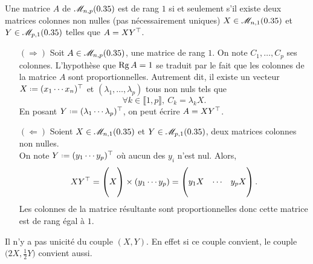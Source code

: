 \begin{prop}{} 
    Une matrice $A$ de $\mathscr{M}_{n,p}(0.35)$ est de rang $1$ si et seulement s'il existe deux matrices colonnes non nulles (pas nécessairement uniques) $X \in \mathscr{M}_{n,1}(0.35)$ et $Y \in \mathscr{M}_{p,1}(0.35)$ telles que $A = X Y^\top$. 
\end{prop}

\begin{preuve}
    \begin{itemize}
        \item[$(\Rightarrow)$] Soit $A \in \mathscr{M}_{n,p}(0.35)$, une matrice de rang $1$. On note $C_1, \dots, C_p$ ses colonnes. L'hypothèse que $\mathrm{Rg}\, A = 1$ se traduit par le fait que les colonnes de la matrice $A$ sont proportionnelles. Autrement dit, il existe un vecteur $X \defeq \Trsp{(x_1 \cdots x_n)}$ et $(\lambda_1, \dots, \lambda_p)$ tous non nuls tels que 
        $$\forall k \in \llbracket 1, p \rrbracket,\ C_k = \lambda_k X.$$
        En posant $Y \defeq \Trsp{(\lambda_1 \cdots \lambda_p)}$, on peut écrire $A = X Y^\top$.
        \item[$(\Leftarrow)$] Soient $X \in \mathscr{M}_{n,1}(0.35)$ et $Y \in \mathscr{M}_{p,1}(0.35)$, deux matrices colonnes non nulles. \\
        On note $Y \defeq \Trsp{(y_1 \cdots y_p)}$ où aucun des $y_i$ n'est nul. Alors,
        $$
        X Y^\top = 
        \begin{pmatrix}
            \\
            X \\
            \\
        \end{pmatrix}
        \times
        (y_1 \cdots y_p)
         = 
        \begin{pmatrix}
            & & \\
            y_1 X & \cdots & y_p X \\
            & & \\
        \end{pmatrix}.
        $$
        Les colonnes de la matrice résultante sont proportionnelles donc cette matrice est de rang égal à $1$. 
    \end{itemize}
\end{preuve}

\begin{remarque}
    Il n'y a pas unicité du couple $(X, Y)$. En effet si ce couple convient, le couple $\big(2X, \frac{1}{2}Y \big)$ convient aussi.
\end{remarque}

